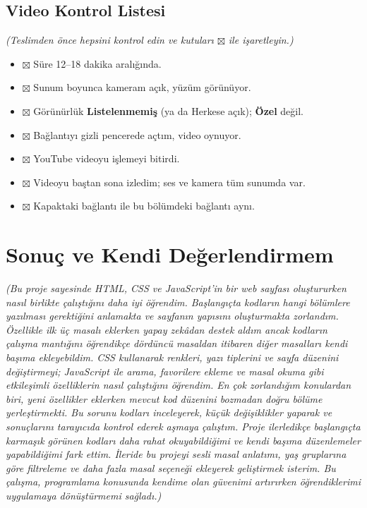 \documentclass[12pt,a4paper]{article}
\newcommand{\aciklama}[1]{{\color{gray}\itshape (#1)}}
\begin{document}
\subsection{Video Kontrol Listesi}
\aciklama{Teslimden önce hepsini kontrol edin ve kutuları $\boxtimes$ ile işaretleyin.}
\begin{itemize}
\item $\boxtimes$ Süre 12--18 dakika aralığında.
  \item $\boxtimes$ Sunum boyunca kameram açık, yüzüm görünüyor.
  \item $\boxtimes$ Görünürlük \textbf{Listelenmemiş} (ya da Herkese açık); \textbf{Özel} değil.
  \item $\boxtimes$ Bağlantıyı gizli pencerede açtım, video oynuyor.
  \item $\boxtimes$ YouTube videoyu işlemeyi bitirdi.
  \item $\boxtimes$ Videoyu baştan sona izledim; ses ve kamera tüm sunumda var.
  \item $\boxtimes$ Kapaktaki bağlantı ile bu bölümdeki bağlantı aynı.
\end{itemize}

\section{Sonuç ve Kendi Değerlendirmem}
\aciklama {Bu proje sayesinde HTML, CSS ve JavaScript'in bir web sayfası oluştururken nasıl birlikte çalıştığını daha iyi öğrendim. Başlangıçta kodların hangi bölümlere yazılması gerektiğini anlamakta ve sayfanın yapısını oluşturmakta zorlandım. Özellikle ilk üç masalı eklerken yapay zekâdan destek aldım ancak kodların çalışma mantığını öğrendikçe dördüncü masaldan itibaren diğer masalları kendi başıma ekleyebildim. CSS kullanarak renkleri, yazı tiplerini ve sayfa düzenini değiştirmeyi; JavaScript ile arama, favorilere ekleme ve masal okuma gibi etkileşimli özelliklerin nasıl çalıştığını öğrendim. En çok zorlandığım konulardan biri, yeni özellikler eklerken mevcut kod düzenini bozmadan doğru bölüme yerleştirmekti. Bu sorunu kodları inceleyerek, küçük değişiklikler yaparak ve sonuçlarını tarayıcıda kontrol ederek aşmaya çalıştım. Proje ilerledikçe başlangıçta karmaşık görünen kodları daha rahat okuyabildiğimi ve kendi başıma düzenlemeler yapabildiğimi fark ettim. İleride bu projeyi sesli masal anlatımı, yaş gruplarına göre filtreleme ve daha fazla masal seçeneği ekleyerek geliştirmek isterim. Bu çalışma, programlama konusunda kendime olan güvenimi artırırken öğrendiklerimi uygulamaya dönüştürmemi sağladı.}
\end{document}
